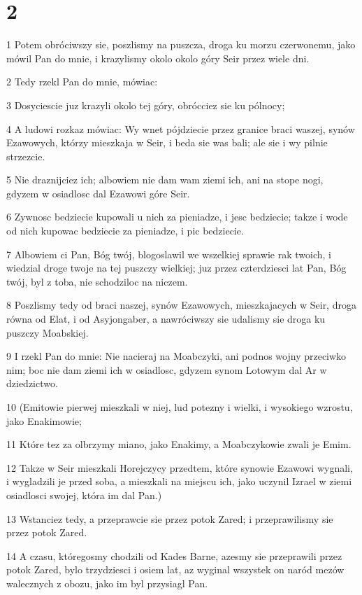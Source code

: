 \chapter{2}

\par 1 Potem obróciwszy sie, poszlismy na puszcza, droga ku morzu czerwonemu, jako mówil Pan do mnie, i krazylismy okolo okolo góry Seir przez wiele dni.
\par 2 Tedy rzekl Pan do mnie, mówiac:
\par 3 Dosyciescie juz krazyli okolo tej góry, obrócciez sie ku pólnocy;
\par 4 A ludowi rozkaz mówiac: Wy wnet pójdziecie przez granice braci waszej, synów Ezawowych, którzy mieszkaja w Seir, i beda sie was bali; ale sie i wy pilnie strzezcie.
\par 5 Nie draznijciez ich; albowiem nie dam wam ziemi ich, ani na stope nogi, gdyzem w osiadlosc dal Ezawowi góre Seir.
\par 6 Zywnosc bedziecie kupowali u nich za pieniadze, i jesc bedziecie; takze i wode od nich kupowac bedziecie za pieniadze, i pic bedziecie.
\par 7 Albowiem ci Pan, Bóg twój, blogoslawil we wszelkiej sprawie rak twoich, i wiedzial droge twoje na tej puszczy wielkiej; juz przez czterdziesci lat Pan, Bóg twój, byl z toba, nie schodziloc na niczem.
\par 8 Poszlismy tedy od braci naszej, synów Ezawowych, mieszkajacych w Seir, droga równa od Elat, i od Asyjongaber, a nawróciwszy sie udalismy sie droga ku puszczy Moabskiej.
\par 9 I rzekl Pan do mnie: Nie nacieraj na Moabczyki, ani podnos wojny przeciwko nim; boc nie dam ziemi ich w osiadlosc, gdyzem synom Lotowym dal Ar w dziedzictwo.
\par 10 (Emitowie pierwej mieszkali w niej, lud potezny i wielki, i wysokiego wzrostu, jako Enakimowie;
\par 11 Które tez za olbrzymy miano, jako Enakimy, a Moabczykowie zwali je Emim.
\par 12 Takze w Seir mieszkali Horejczycy przedtem, które synowie Ezawowi wygnali, i wygladzili je przed soba, a mieszkali na miejscu ich, jako uczynil Izrael w ziemi osiadlosci swojej, która im dal Pan.)
\par 13 Wstanciez tedy, a przeprawcie sie przez potok Zared; i przeprawilismy sie przez potok Zared.
\par 14 A czasu, któregosmy chodzili od Kades Barne, azesmy sie przeprawili przez potok Zared, bylo trzydziesci i osiem lat, az wyginal wszystek on naród mezów walecznych z obozu, jako im byl przysiagl Pan.
